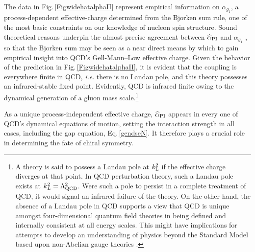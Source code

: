 The data in Fig.\,\ref{FigwidehatalphaII} represent empirical information on $\alpha_{g_1}$, a process-dependent effective-charge \cite{Grunberg:1982fw} determined from the Bjorken sum rule, one of the most basic constraints on our knowledge of nucleon spin structure.  Sound theoretical reasons underpin the almost precise agreement between $\widehat{\alpha}_{\rm PI}$ and $\alpha_{g_1}$ \cite{Binosi:2016nmeRMP}, so that the Bjorken sum may be seen as a near direct means by which to gain empirical insight into QCD's Gell-Mann--Low effective charge.
%
Given the behavior of the prediction in Fig.\,\ref{FigwidehatalphaII}, it is evident that the coupling is everywhere finite in QCD, \emph{i.e}. there is no Landau pole, and this theory possesses an infrared-stable fixed point.  Evidently, QCD is infrared finite owing to the dynamical generation of a gluon mass scale.\footnote{%
A theory is said to possess a Landau pole at $k^2_{\rm L}$ if the effective charge diverges at that point.  In QCD perturbation theory, such a Landau pole exists at $k^2_L=\Lambda_{\rm QCD}^2$.  Were such a pole to persist in a complete treatment of QCD, it would signal an infrared failure of the theory.  On the other hand, the absence of a Landau pole in QCD supports a view that QCD is unique amongst four-dimensional quantum field theories in being defined and internally consistent at all energy scales.  This might have implications for attempts to develop an understanding of physics beyond the Standard Model based upon non-Abelian gauge theories \cite{Appelquist:1996dq, Sannino:2009za, Appelquist:2009ka, Hayakawa:2010yn, Cheng:2013eu, Aoki:2013xza, DeGrand:2015zxa, Binosi:2016xxu}.}

As a unique process-independent effective charge, $\widehat{\alpha}_{\rm PI}$ appears in every one of QCD's dynamical equations of motion, setting the interaction strength in all cases, including the gap equation, Eq.\,\eqref{gendseN}.  It therefore plays a crucial role in determining the fate of chiral symmetry.

